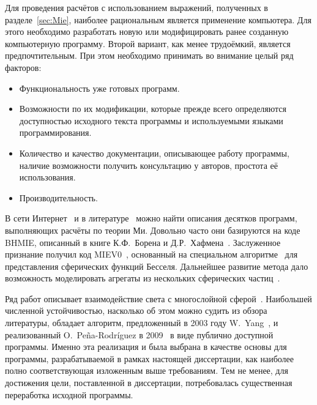 
Для проведения расчётов с использованием выражений, полученных в
разделе~\ref{sec:Mie}, наиболее рациональным является применение
компьютера.  Для этого необходимо разработать новую или модифицировать
ранее созданную компьютерную программу. Второй вариант, как менее
трудоёмкий, является предпочтительным.  При этом необходимо принимать
во внимание целый ряд факторов:
\begin{itemize}
\item Функциональность уже готовых программ.
\item Возможности по их модификации, которые прежде всего определяются
  доступностью исходного текста программы и используемыми языками
  программирования.
\item Количество и качество документации, описывающее работу
  программы, наличие возможности получить консультацию у авторов,
  простота её использования.
\item Производительность.
\end{itemize}

В сети Интернет~\cite{scattport,wiki-mie-codes} и в
литературе~\cite{Wriedt-2009} можно найти описания десятков программ,
выполняющих расчёты по теории Ми.  Довольно часто они базируются на
коде BHMIE, описанный в книге К.Ф.~Борена и
Д.Р.~Хафмена~\cite{Bohren-1983}.  Заслуженное признание получил код
MIEV0~\cite{Wiscombe-1980}, основанный на специальном
алгоритме~\cite{Lentz-76} для представления сферических функций
Бесселя. Дальнейшее развитие метода дало возможность моделировать
агрегаты из нескольких сферических частиц~\cite{Mackowski-96,Xu-95}.

Ряд работ описывает взаимодействие света с многослойной
сферой~\cite{Kai-94,Wu-97, Bhandari-85}.  Наибольшей численной
устойчивостью, насколько об этом можно судить из обзора литературы,
обладает алгоритм, предложенный в 2003 году W.~Yang~\cite{Yang-2003},
и реализованный O.~Pe\~{n}a-Rodr\'{i}guez в
2009~\cite{Pena-scattnlay-2009} в виде публично доступной программы.
Именно эта реализация и была выбрана в качестве основы для программы,
разрабатываемой в рамках настоящей диссертации, как наиболее полно
соответствующая изложенным выше требованиям.  Тем не менее, для достижения
цели, поставленной в диссертации, потребовалась существенная
переработка исходной программы.

